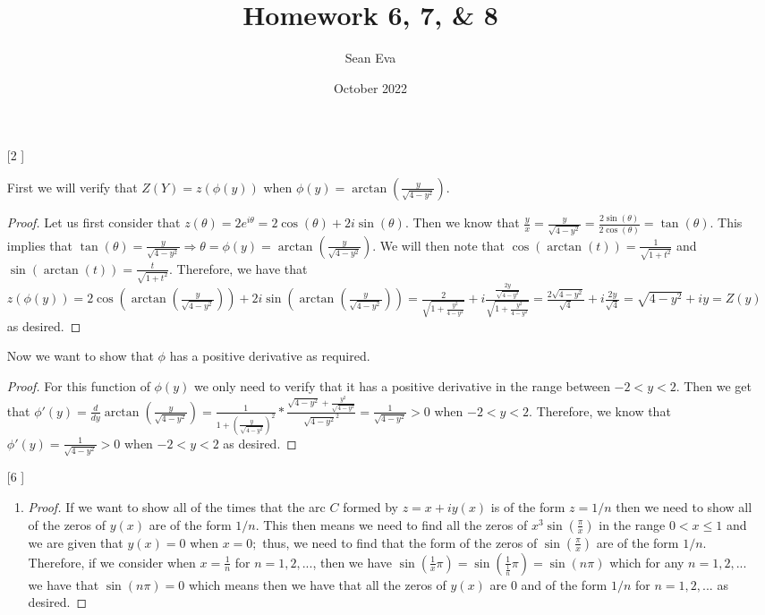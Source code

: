\documentclass{article}
\title{Homework 6, 7, \& 8}
\author{Sean Eva}
\date{October 2022}
\theoremstyle{definition}
\begin{document}
\maketitle

\begin{enumerate}
    \item [[\phantom{-}2]]
    
    First we will verify that $Z(Y) = z(\phi(y))$ when $\phi(y) = \arctan(\frac{y}{\sqrt{4-y^2}})$.\\
    \begin{proof}
    Let us first consider that $z(\theta) = 2e^{i\theta} = 2\cos(\theta) + 2i\sin(\theta)$. Then we know that $\frac{y}{x} = \frac{y}{\sqrt{4-y^2}} = \frac{2\sin(\theta)}{2\cos(\theta)} = \tan(\theta)$. This implies that $\tan(\theta) = \frac{y}{\sqrt{4-y^2}} \Rightarrow \theta = \phi(y) = \arctan(\frac{y}{\sqrt{4-y^2}})$. We will then note that $\cos(\arctan(t)) = \frac{1}{\sqrt{1 + t^2}}$ and $\sin(\arctan(t)) = \frac{t}{\sqrt{1 + t^2}}.$ Therefore, we have that $z(\phi(y)) = 2\cos(\arctan(\frac{y}{\sqrt{4-y^2}})) + 2i\sin(\arctan(\frac{y}{\sqrt{4-y^2}})) = \frac{2}{\sqrt{1 + \frac{y^2}{4-y^2}}} + i\frac{\frac{2y}{\sqrt{4-y^2}}}{\sqrt{1 + \frac{y^2}{4-y^2}}} = \frac{2\sqrt{4-y^2}}{\sqrt{4}} + i\frac{2y}{\sqrt{4}} = \sqrt{4-y^2} + iy = Z(y)$ as desired.
    \end{proof}
    Now we want to show that $\phi$ has a positive derivative as required.\\
    \begin{proof}
    For this function of $\phi(y)$ we only need to verify that it has a positive derivative in the range between $-2 < y < 2$. Then we get that $\phi'(y) = \frac{d}{dy}\arctan(\frac{y}{\sqrt{4-y^2}}) = \frac{1}{1 + (\frac{y}{\sqrt{4-y^2}})^2} * \frac{\sqrt{4-y^2} + \frac{y^2}{\sqrt{4-y^2}}}{\sqrt{4-y^2}^2} = \frac{1}{\sqrt{4-y^2}} > 0$ when $-2 < y < 2$. Therefore, we know that $\phi'(y) = \frac{1}{\sqrt{4-y^2}} > 0$ when $-2 < y < 2$ as desired.
    \end{proof}
    
    \item [[\phantom{-}6]]
    
    \begin{enumerate}
        \item 
        
        \begin{proof}
        If we want to show all of the times that the arc $C$ formed by $z = x + iy(x)$ is of the form $z = 1/n$ then we need to show all of the zeros of $y(x)$ are of the form $1/n$. This then means we need to find all the zeros of $x^3\sin(\frac{\pi}{x})$ in the range $0 < x \leq 1$ and we are given that $y(x) = 0$ when $x = 0;$ thus, we need to find that the form of the zeros of $\sin(\frac{\pi}{x})$ are of the form $1/n$. Therefore, if we consider when $x = \frac{1}{n}$ for $n = 1, 2, ...$, then we have $\sin(\frac{1}{x}\pi) = \sin(\frac{1}{\frac{1}{n}}\pi) = \sin(n\pi)$ which for any $n = 1, 2, ...$ we have that $\sin(n\pi) = 0$ which means then we have that all the zeros of $y(x)$ are $0$ and of the form $1/n$ for $n = 1, 2, ...$ as desired.
        \end{proof}
        

\end{enumerate}
\end{enumerate}
\end{document}
